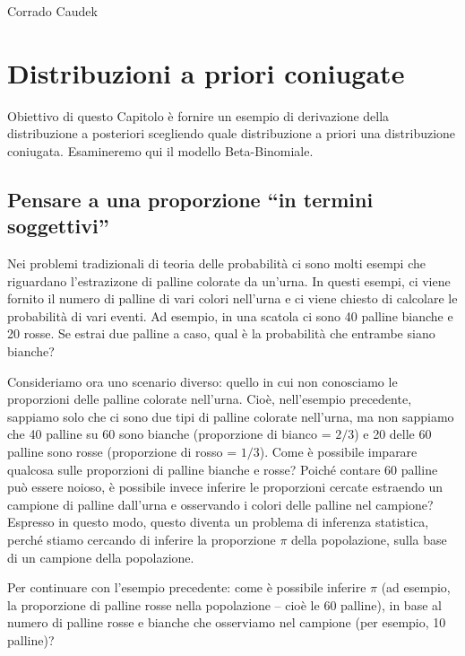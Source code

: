 \documentclass[
  10pt,
  italian,
  a4paper,
  extrafontsizes,onecolumn,openright
  ]{memoir}
\theoremstyle{definition}
\theoremstyle{definition}
\theoremstyle{definition}
\theoremstyle{definition}
\theoremstyle{remark}
\begin{document}
\bigskip

Corrado Caudek

\mainmatter

\hypertarget{chapter-distr-coniugate}{%
\chapter{Distribuzioni a priori coniugate}\label{chapter-distr-coniugate}}

Obiettivo di questo Capitolo è fornire un esempio di derivazione della distribuzione a posteriori scegliendo quale distribuzione a priori una distribuzione coniugata. Esamineremo qui il modello Beta-Binomiale.

\hypertarget{pensare-a-una-proporzione-in-termini-soggettivi}{%
\section{Pensare a una proporzione ``in termini soggettivi''}\label{pensare-a-una-proporzione-in-termini-soggettivi}}

Nei problemi tradizionali di teoria delle probabilità ci sono molti esempi che riguardano l'estrazizone di palline colorate da un'urna. In questi esempi, ci viene fornito il numero di palline di vari colori nell'urna e ci viene chiesto di calcolare le probabilità di vari eventi. Ad esempio, in una scatola ci sono 40 palline bianche e 20 rosse. Se estrai due palline a caso, qual è la probabilità che entrambe siano bianche?

Consideriamo ora uno scenario diverso: quello in cui non conosciamo le proporzioni delle palline colorate nell'urna. Cioè, nell'esempio precedente, sappiamo solo che ci sono due tipi di palline colorate nell'urna, ma non sappiamo che 40 palline su 60 sono bianche (proporzione di bianco = \(2/3\)) e 20 delle 60 palline sono rosse (proporzione di rosso = \(1/3\)). Come è possibile imparare qualcosa sulle proporzioni di palline bianche e rosse? Poiché contare 60 palline può essere noioso, è possibile invece inferire le proporzioni cercate estraendo un campione di palline dall'urna e osservando i colori delle palline nel campione? Espresso in questo modo, questo diventa un problema di inferenza statistica, perché stiamo cercando di inferire la proporzione \(\pi\) della popolazione, sulla base di un campione della popolazione.

Per continuare con l'esempio precedente: come è possibile inferire \(\pi\) (ad esempio, la proporzione di palline rosse nella popolazione -- cioè le 60 palline), in base al numero di palline rosse e bianche che osserviamo nel campione (per esempio, 10 palline)?
\end{document}
